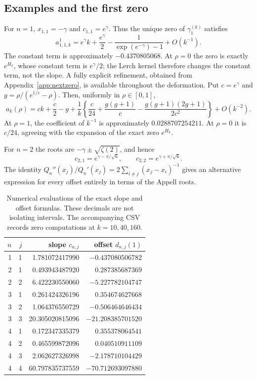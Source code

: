 \documentclass[11pt]{article}
\theoremstyle{definition}
\theoremstyle{remark}
\begin{document}
\subsection{Examples and the first zero}
For $n=1$, $x_{1,1}=-\gamma$ and $c_{1,1}=e^\gamma$. Thus the unique zero of $\gamma_1^{(k)}$ satisfies
\begin{equation}\label{eq:n1asympt}
 a_{1,1,k}^{1}
   =e^\gamma k+\frac{e^\gamma}{2}
      -\frac1{\exp(e^{-\gamma})-1}+O(k^{-1}).
\end{equation}
The constant term is approximately $-0.4370805068$. At $\rho=0$ the zero is exactly $e^{H_k}$, whose constant term is $e^\gamma/2$; the Lerch kernel therefore changes the constant term, not the slope.
A fully explicit refinement, obtained from Appendix~\ref{app:nextzero}, is available throughout the deformation. Put $c=e^\gamma$ and $g=\rho/(e^{1/c}-\rho)$. Then, uniformly in $\rho\in[0,1]$,
\begin{equation}\label{eq:n1third}
 a_k(\rho)=ck+\frac c2-g
   +\frac1k\left\{\frac c{24}+\frac{g(g+1)}c
          -\frac{g(g+1)(2g+1)}{2c^2}\right\}+O(k^{-2}).
\end{equation}
At $\rho=1$, the coefficient of $k^{-1}$ is approximately $0.0288707254211$. At $\rho=0$ it is $c/24$, agreeing with the expansion of the exact zero $e^{H_k}$.


For $n=2$ the roots are $-\gamma\pm\sqrt{\zeta(2)}$, and hence
\begin{equation}\label{eq:n2slopes}
 c_{2,1}=e^{\gamma-\pi/\sqrt6},\qquad
 c_{2,2}=e^{\gamma+\pi/\sqrt6}.
\end{equation}
The identity $Q_n''(x_j)/Q_n'(x_j)=2\sum_{i\neq j}(x_j-x_i)^{-1}$ gives an alternative expression for every offset entirely in terms of the Appell roots.

\begin{table}[htbp]
\centering\small
\begin{tabular}{rrrr}
\toprule
$n$ & $j$ & slope $c_{n,j}$ & offset $d_{n,j}(1)$\\
\midrule
1&1&1.781072417990&$-0.437080506782$\\
2&1&0.493943487920&$\phantom{-}0.287385687369$\\
2&2&6.422230550060&$-5.227782104747$\\
3&1&0.261424326196&$\phantom{-}0.354674627668$\\
3&2&1.064376550729&$-0.506464646434$\\
3&3&20.305020815096&$-21.208385701520$\\
4&1&0.172347335379&$\phantom{-}0.355378064541$\\
4&2&0.465599872096&$\phantom{-}0.040510911109$\\
4&3&2.062627326998&$-2.178710104429$\\
4&4&60.797835737559&$-70.712693097880$\\
\bottomrule
\end{tabular}
\caption{Numerical evaluations of the exact slope and offset formulas. These decimals are not isolating intervals. The accompanying CSV records zero computations at $k=10,40,160$.}
\label{tab:slopes}
\end{table}
\end{document}
